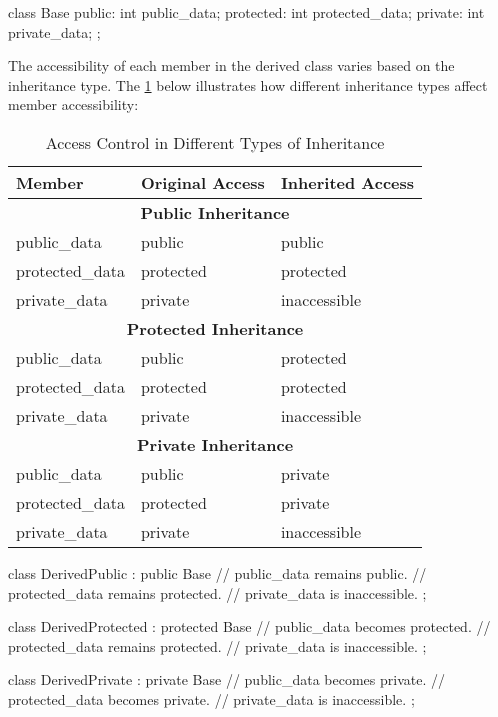 \begin{codeblock}[language=C++]
class Base {
public:
    int public_data;
protected:
    int protected_data;
private:
    int private_data;
};
\end{codeblock}

The accessibility of each member in the derived class varies based on the inheritance type. The \cref{tab:inheritance_access} below illustrates how different inheritance types affect member accessibility:

\renewcommand{\arraystretch}{1}  %
\begin{table}[H]
    \centering
    \small
    \begin{tabular}{|p{3.5cm}|p{3.5cm}|p{3.5cm}|}
        \hline
        \textbf{Member} & \textbf{Original Access} & \textbf{Inherited Access} \\
        \hline
        \multicolumn{3}{|c|}{\textbf{Public Inheritance}} \\
        \hline
        public\_data & public & public \\
        protected\_data & protected & protected \\
        private\_data & private & inaccessible \\
        \hline
        \multicolumn{3}{|c|}{\textbf{Protected Inheritance}} \\
        \hline
        public\_data & public & protected \\
        protected\_data & protected & protected \\
        private\_data & private & inaccessible \\
        \hline
        \multicolumn{3}{|c|}{\textbf{Private Inheritance}} \\
        \hline
        public\_data & public & private \\
        protected\_data & protected & private \\
        private\_data & private & inaccessible \\
        \hline
    \end{tabular}
    \caption{Access Control in Different Types of Inheritance}
    \label{tab:inheritance_access}
\end{table}

\begin{codeblock}[language=C++]
class DerivedPublic : public Base { 
    // public_data remains public.
    // protected_data remains protected.
    // private_data is inaccessible.
};

class DerivedProtected : protected Base { 
    // public_data becomes protected.
    // protected_data remains protected.
    // private_data is inaccessible.
};

class DerivedPrivate : private Base { 
    // public_data becomes private.
    // protected_data becomes private.
    // private_data is inaccessible.
};
\end{codeblock}

